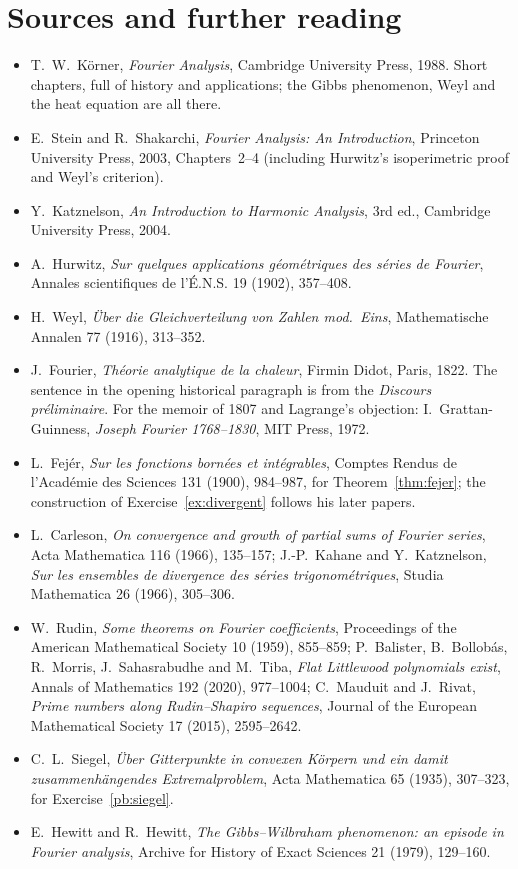 \section*{Sources and further reading}

\begin{itemize}
\item T.~W.~K\"orner, \emph{Fourier Analysis}, Cambridge University Press, 1988. Short chapters, full of history and
applications; the Gibbs phenomenon, Weyl and the heat equation are all there.
\item E.~Stein and R.~Shakarchi, \emph{Fourier Analysis: An Introduction}, Princeton University Press, 2003, Chapters~2--4
(including Hurwitz's isoperimetric proof and Weyl's criterion).
\item Y.~Katznelson, \emph{An Introduction to Harmonic Analysis}, 3rd ed., Cambridge University Press, 2004.
\item A.~Hurwitz, \emph{Sur quelques applications g\'eom\'etriques des s\'eries de Fourier}, Annales scientifiques de l'\'E.N.S.
19 (1902), 357--408.
\item H.~Weyl, \emph{\"Uber die Gleichverteilung von Zahlen mod.~Eins}, Mathematische Annalen 77 (1916), 313--352.
\item J.~Fourier, \emph{Th\'eorie analytique de la chaleur}, Firmin Didot, Paris, 1822. The sentence in the opening historical paragraph is from the
\emph{Discours pr\'eliminaire}. For the memoir of 1807 and Lagrange's objection: I.~Grattan-Guinness, \emph{Joseph Fourier
1768--1830}, MIT Press, 1972.
\item L.~Fej\'er, \emph{Sur les fonctions born\'ees et int\'egrables}, Comptes Rendus de l'Acad\'emie des Sciences 131 (1900),
984--987, for Theorem~\ref{thm:fejer}; the construction of Exercise~\ref{ex:divergent} follows his later papers.
\item L.~Carleson, \emph{On convergence and growth of partial sums of Fourier series}, Acta Mathematica 116 (1966), 135--157;
J.-P.~Kahane and Y.~Katznelson, \emph{Sur les ensembles de divergence des s\'eries trigonom\'etriques}, Studia Mathematica 26
(1966), 305--306.
\item W.~Rudin, \emph{Some theorems on Fourier coefficients}, Proceedings of the American Mathematical Society 10 (1959),
855--859; P.~Balister, B.~Bollob\'as, R.~Morris, J.~Sahasrabudhe and M.~Tiba, \emph{Flat Littlewood polynomials exist},
Annals of Mathematics 192 (2020), 977--1004; C.~Mauduit and J.~Rivat, \emph{Prime numbers along Rudin--Shapiro sequences},
Journal of the European Mathematical Society 17 (2015), 2595--2642.
\item C.~L.~Siegel, \emph{\"Uber Gitterpunkte in convexen K\"orpern und ein damit zusammenh\"angendes Extremalproblem}, Acta
Mathematica 65 (1935), 307--323, for Exercise~\ref{pb:siegel}.
\item E.~Hewitt and R.~Hewitt, \emph{The Gibbs--Wilbraham phenomenon: an episode in Fourier analysis}, Archive for History of
Exact Sciences 21 (1979), 129--160.
\end{itemize}
